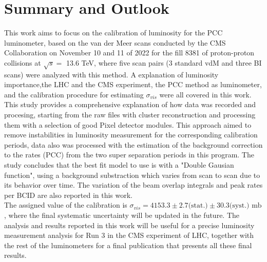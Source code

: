 \chapter{Summary and Outlook}

This work aims to focus on the calibration of luminosity for the PCC  luminometer, based on the van der Meer scans conducted by the CMS Collaboration on November 10 and 11 of 2022 for the fill 8381 of proton-proton collisions at $\sqrt{s}=$ 13.6 TeV, where five scan pairs (3 standard vdM and three BI scans) were analyzed with this method.
A explanation of luminosity importance,the LHC and the CMS experiment, the PCC method as luminometer, and the calibration procedure for estimating $\sigma_{vis}$ were all covered in this work.\\

This study provides a comprehensive explanation of how data was recorded and procesing, starting from the raw files with cluster reconstruction and processing them with a  selection of  good Pixel detector modules. This approach aimed to remove instabilities in luminosity measurement for the corresponding calibration periods,  data also was processed with the  estimation of the background correction to the rates (PCC) from the two super separation periods in this program. The study concludes that the best fit model to use is  with a "Double Gausian function", using a background substraction which varies from scan to scan  due to its behavior over time. The variation of the beam overlap integrals and peak rates per BCID are also reported in this work.\\

The assigned value of the calibration is $\sigma_{vis} = 4153.3 \pm 2.7 \text{(stat.)} \pm 30.3 \text{(syst.)} \text{ mb}$, where the final systematic uncertainty will be updated in the future. The analysis and results reported in this work will be useful for a precise luminosity measurement analysis for Run 3 in the CMS experiment of LHC, together with the rest of the luminometers  for a final publication that presents all these final results.
